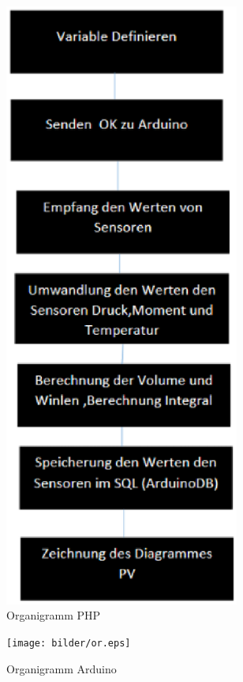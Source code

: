 \begin{figure}[!htb]
\begin{center}
\includegraphics[height=20cm]{bilder/Orga.eps}
\end{center}
\caption{Organigramm PHP}\label{fig:Orga}
\end{figure}


\begin{figure}[!htb]
\begin{center}
\texttt{[image: bilder/or.eps]}
\end{center}
\caption{Organigramm Arduino}\label{fig:Orga}
\end{figure}


